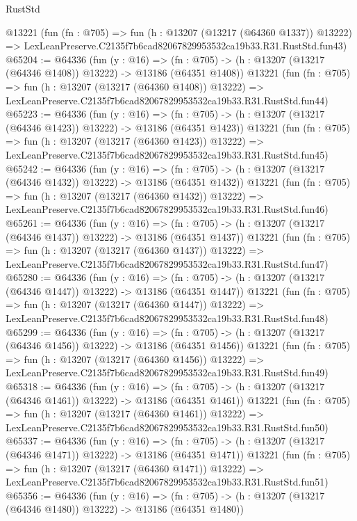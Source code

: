 \begin{lexlean}{RustStd}
\begin{coremodule}
    @13221
    (fun (fn : @705) =>
    fun (h : @13207 (@13217 (@64360 @1337)) @13222) =>
    LexLeanPreserve.C2135f7b6cad82067829953532ca19b33.R31.RustStd.fun43)
@65204 := @64336
    (fun (y : @16) =>
    (fn : @705) -> (h : @13207 (@13217 (@64346 @1408)) @13222) -> @13186 (@64351 @1408))
    @13221
    (fun (fn : @705) =>
    fun (h : @13207 (@13217 (@64360 @1408)) @13222) =>
    LexLeanPreserve.C2135f7b6cad82067829953532ca19b33.R31.RustStd.fun44)
@65223 := @64336
    (fun (y : @16) =>
    (fn : @705) -> (h : @13207 (@13217 (@64346 @1423)) @13222) -> @13186 (@64351 @1423))
    @13221
    (fun (fn : @705) =>
    fun (h : @13207 (@13217 (@64360 @1423)) @13222) =>
    LexLeanPreserve.C2135f7b6cad82067829953532ca19b33.R31.RustStd.fun45)
@65242 := @64336
    (fun (y : @16) =>
    (fn : @705) -> (h : @13207 (@13217 (@64346 @1432)) @13222) -> @13186 (@64351 @1432))
    @13221
    (fun (fn : @705) =>
    fun (h : @13207 (@13217 (@64360 @1432)) @13222) =>
    LexLeanPreserve.C2135f7b6cad82067829953532ca19b33.R31.RustStd.fun46)
@65261 := @64336
    (fun (y : @16) =>
    (fn : @705) -> (h : @13207 (@13217 (@64346 @1437)) @13222) -> @13186 (@64351 @1437))
    @13221
    (fun (fn : @705) =>
    fun (h : @13207 (@13217 (@64360 @1437)) @13222) =>
    LexLeanPreserve.C2135f7b6cad82067829953532ca19b33.R31.RustStd.fun47)
@65280 := @64336
    (fun (y : @16) =>
    (fn : @705) -> (h : @13207 (@13217 (@64346 @1447)) @13222) -> @13186 (@64351 @1447))
    @13221
    (fun (fn : @705) =>
    fun (h : @13207 (@13217 (@64360 @1447)) @13222) =>
    LexLeanPreserve.C2135f7b6cad82067829953532ca19b33.R31.RustStd.fun48)
@65299 := @64336
    (fun (y : @16) =>
    (fn : @705) -> (h : @13207 (@13217 (@64346 @1456)) @13222) -> @13186 (@64351 @1456))
    @13221
    (fun (fn : @705) =>
    fun (h : @13207 (@13217 (@64360 @1456)) @13222) =>
    LexLeanPreserve.C2135f7b6cad82067829953532ca19b33.R31.RustStd.fun49)
@65318 := @64336
    (fun (y : @16) =>
    (fn : @705) -> (h : @13207 (@13217 (@64346 @1461)) @13222) -> @13186 (@64351 @1461))
    @13221
    (fun (fn : @705) =>
    fun (h : @13207 (@13217 (@64360 @1461)) @13222) =>
    LexLeanPreserve.C2135f7b6cad82067829953532ca19b33.R31.RustStd.fun50)
@65337 := @64336
    (fun (y : @16) =>
    (fn : @705) -> (h : @13207 (@13217 (@64346 @1471)) @13222) -> @13186 (@64351 @1471))
    @13221
    (fun (fn : @705) =>
    fun (h : @13207 (@13217 (@64360 @1471)) @13222) =>
    LexLeanPreserve.C2135f7b6cad82067829953532ca19b33.R31.RustStd.fun51)
@65356 := @64336
    (fun (y : @16) =>
    (fn : @705) -> (h : @13207 (@13217 (@64346 @1480)) @13222) -> @13186 (@64351 @1480))

\end{coremodule}
\end{lexlean}
